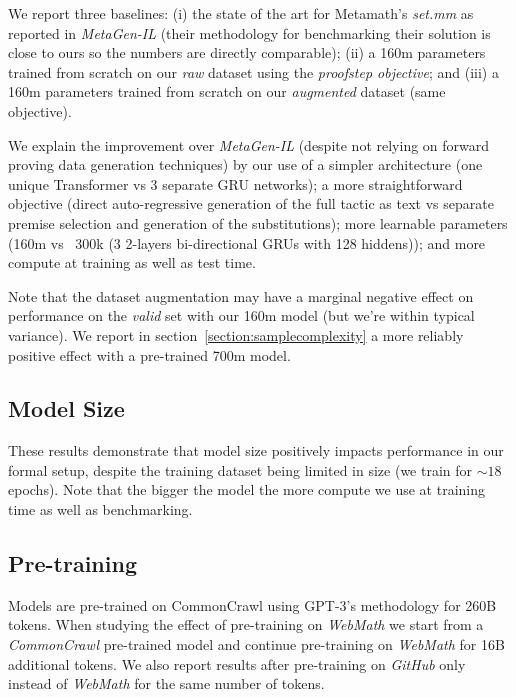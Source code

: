 We report three baselines: (i) the state of the art for Metamath's \textit{set.mm} as reported in \textit{MetaGen-IL}\cite{wang2020learning} (their methodology for benchmarking their solution is close to ours so the numbers are directly comparable); (ii) a 160m parameters trained from scratch on our \textit{raw} dataset using the \textit{proofstep objective}; and (iii) a 160m parameters trained from scratch on our \textit{augmented} dataset (same objective).

We explain the improvement over \textit{MetaGen-IL} (despite not relying on forward proving data generation techniques) by our use of a simpler architecture (one unique Transformer vs 3 separate GRU networks); a more straightforward objective (direct auto-regressive generation of the full tactic as text vs separate premise selection and generation of the substitutions); more learnable parameters (160m vs ~300k (3 2-layers bi-directional GRUs with 128 hiddens)); and more compute at training as well as test time.

Note that the dataset augmentation may have a marginal negative effect on performance on the \textit{valid} set with our 160m model (but we're within typical variance). We report in section~\ref{section:samplecomplexity} a more reliably positive effect with a pre-trained 700m model.

\subsection{Model Size}

These results demonstrate that model size positively impacts performance in our formal setup, despite the training dataset being limited in size (we train for $\sim 18$ epochs). Note that the bigger the model the more compute we use at training time as well as benchmarking.

\subsection{Pre-training}

Models are pre-trained on CommonCrawl using GPT-3's\cite{brown2020language} methodology for 260B tokens. When studying the effect of pre-training on \textit{WebMath} we start from a \textit{CommonCrawl} pre-trained model and continue pre-training on \textit{WebMath} for 16B additional tokens. We also report results after pre-training on \textit{GitHub} only instead of \textit{WebMath} for the same number of tokens.  

